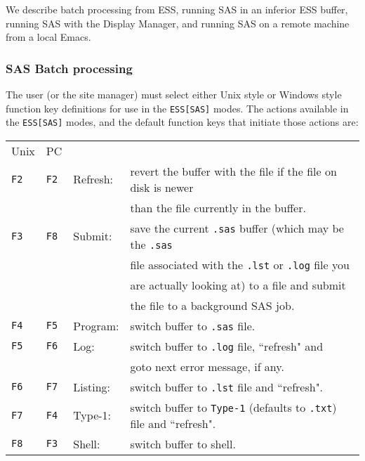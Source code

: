 \documentclass{article}
\newcommand{\stexttt}[1]{{\small\texttt{#1}}}
\begin{document}
We describe batch processing from ESS, running SAS in an inferior ESS buffer,
running SAS with the Display Manager,
and running SAS on a remote machine from a local Emacs.

\subsubsection{SAS Batch processing}
\label{sec:SAS:proc:batch}

The user (or the site manager) must select either Unix style or
Windows style function key definitions for use in the
\stexttt{ESS[SAS]} modes.  The actions available in the
\stexttt{ESS[SAS]} modes, and the default function keys that initiate
those actions are:\\
\begin{tabular}{llll}
Unix& PC&\\
\stexttt{F2} &\stexttt{F2}& Refresh:&revert the buffer with the file if the file on disk is newer\\
\stexttt{}   &\stexttt{}  &         &       than the file currently in the buffer.\\
\stexttt{F3} &\stexttt{F8}& Submit: &save   the current \stexttt{.sas} buffer (which may be the \stexttt{.sas}\\
\stexttt{}   &\stexttt{}  &         &       file associated with the \stexttt{.lst} or \stexttt{.log} file you\\
\stexttt{}   &\stexttt{}  &         &       are actually looking at) to a file and submit\\
\stexttt{}   &\stexttt{}  &         &       the file to a background SAS job.\\
\stexttt{F4} &\stexttt{F5}& Program:&switch buffer to \stexttt{.sas} file.\\
\stexttt{F5} &\stexttt{F6}& Log:    &switch buffer to \stexttt{.log} file, ``refresh" and \\
\stexttt{}   &\stexttt{}  &         &        goto next error message, if any.\\
\stexttt{F6} &\stexttt{F7}& Listing:&switch buffer to \stexttt{.lst} file and ``refresh".\\
\stexttt{F7} &\stexttt{F4}& Type-1: &switch buffer to \stexttt{Type-1} (defaults to \stexttt{.txt}) file and ``refresh".\\
\stexttt{F8} &\stexttt{F3}& Shell:  &switch buffer to shell.\\
\end{tabular}
\end{document}
